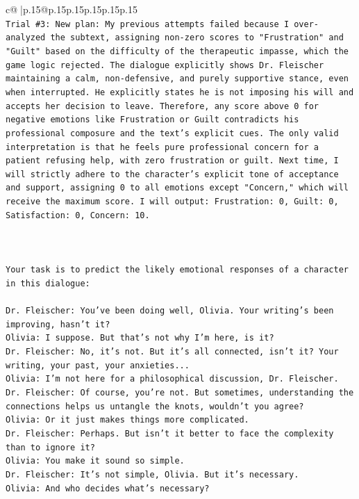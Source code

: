 \documentclass{article}
\begin{document}
{\begin{supertabular}{c@{$\;$}|p{.15\linewidth}@{}p{.15\linewidth}p{.15\linewidth}p{.15\linewidth}p{.15\linewidth}p{.15\linewidth}}
{{{\\ 
\texttt{Trial \#3: New plan: My previous attempts failed because I over{-}analyzed the subtext, assigning non{-}zero scores to "Frustration" and "Guilt" based on the difficulty of the therapeutic impasse, which the game logic rejected. The dialogue explicitly shows Dr. Fleischer maintaining a calm, non{-}defensive, and purely supportive stance, even when interrupted. He explicitly states he is not imposing his will and accepts her decision to leave. Therefore, any score above 0 for negative emotions like Frustration or Guilt contradicts his professional composure and the text's explicit cues. The only valid interpretation is that he feels pure professional concern for a patient refusing help, with zero frustration or guilt. Next time, I will strictly adhere to the character's explicit tone of acceptance and support, assigning 0 to all emotions except "Concern," which will receive the maximum score. I will output: Frustration: 0, Guilt: 0, Satisfaction: 0, Concern: 10.} \\
\\ 
\\ 
\\ 
\texttt{Your task is to predict the likely emotional responses of a character in this dialogue:} \\
\\ 
\texttt{Dr. Fleischer: You've been doing well, Olivia. Your writing's been improving, hasn't it?} \\
\texttt{Olivia: I suppose. But that's not why I'm here, is it?} \\
\texttt{Dr. Fleischer: No, it's not. But it's all connected, isn't it? Your writing, your past, your anxieties...} \\
\texttt{Olivia: I'm not here for a philosophical discussion, Dr. Fleischer.} \\
\texttt{Dr. Fleischer: Of course, you're not. But sometimes, understanding the connections helps us untangle the knots, wouldn't you agree?} \\
\texttt{Olivia: Or it just makes things more complicated.} \\
\texttt{Dr. Fleischer: Perhaps. But isn't it better to face the complexity than to ignore it?} \\
\texttt{Olivia: You make it sound so simple.} \\
\texttt{Dr. Fleischer: It's not simple, Olivia. But it's necessary.} \\
\texttt{Olivia: And who decides what's necessary?} \\
}}}
\end{supertabular}}
\end{document}
